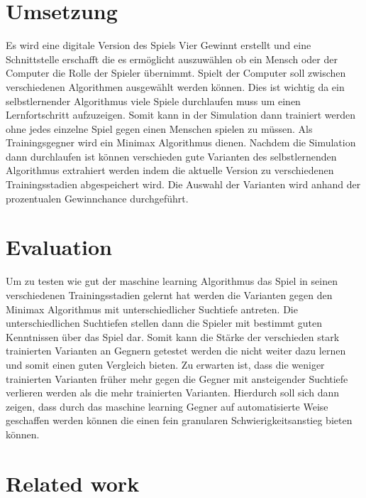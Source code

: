 \section{Umsetzung}

Es wird eine digitale Version des Spiels Vier Gewinnt erstellt und eine Schnittstelle erschafft die es ermöglicht auszuwählen ob ein Mensch oder der Computer die Rolle der Spieler übernimmt. Spielt der Computer soll zwischen verschiedenen Algorithmen ausgewählt werden können. Dies ist wichtig da ein selbstlernender Algorithmus viele Spiele durchlaufen muss um einen Lernfortschritt aufzuzeigen. Somit kann in der Simulation dann trainiert werden ohne jedes einzelne Spiel gegen einen Menschen spielen zu müssen. Als Trainingsgegner wird ein Minimax Algorithmus dienen. Nachdem die Simulation dann durchlaufen ist können verschieden gute Varianten des selbstlernenden Algorithmus extrahiert werden indem die aktuelle Version zu verschiedenen Trainingsstadien abgespeichert wird. Die Auswahl der Varianten wird anhand der prozentualen Gewinnchance durchgeführt. 

\section{Evaluation}
Um zu testen wie gut der maschine learning Algorithmus das Spiel in seinen verschiedenen Trainingsstadien gelernt hat werden die Varianten gegen den Minimax Algorithmus mit unterschiedlicher Suchtiefe antreten. 
Die unterschiedlichen Suchtiefen stellen dann die Spieler mit bestimmt guten Kenntnissen über das Spiel dar. Somit kann die Stärke der verschieden stark trainierten Varianten an Gegnern getestet werden die nicht weiter dazu lernen und somit einen guten Vergleich bieten.
Zu erwarten ist, dass die weniger trainierten Varianten früher mehr gegen die Gegner mit ansteigender Suchtiefe verlieren werden als die mehr trainierten Varianten. 
Hierdurch soll sich dann zeigen, dass durch das maschine learning Gegner auf automatisierte Weise geschaffen werden können die einen fein granularen Schwierigkeitsanstieg bieten können.

\section{Related work}










